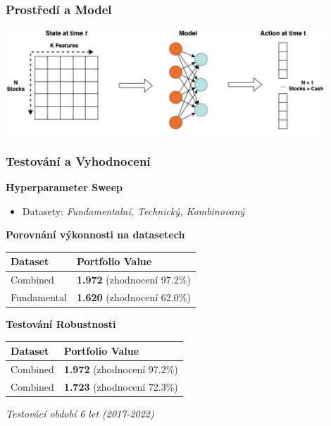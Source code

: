 \begin{frame}
    \frametitle{Prostředí a Model}

    \begin{center}
        \centering
        \includegraphics[width=0.9\textwidth]{img/env}
    \end{center}
\end{frame}

\begin{frame}
    \frametitle{Testování a Vyhodnocení}
    \textbf{Hyperparameter Sweep}
    \begin{itemize}
        \item Datasety: \textit{Fundamentalní, Technický, Kombinovaný}
    \end{itemize}
    \textbf{Porovnání výkonnosti na datasetech}
    \begin{table}
        \centering
        {\footnotesize
            \begin{tabular}{|ll|}
                \hline
                \textbf{Dataset}                        & \textbf{Portfolio Value}                                       \\ \hline
                \textcolor[RGB]{50,150,50}{Combined}    & \textcolor[RGB]{50,150,50}{\textbf{1.972} (zhodnocení 97.2\%)} \\
                \textcolor[RGB]{150,50,50}{Fundamental} & \textcolor[RGB]{150,50,50}{\textbf{1.620} (zhodnocení 62.0\%)} \\ \hline
            \end{tabular}
        }
        \label{tab:datasets-comparison}
    \end{table}
    \textbf{Testování Robustnosti}
    \begin{table}[H]
        \centering
        {\footnotesize
            \begin{tabular}{|ll|}
                \hline
                \textbf{Dataset}                     & \textbf{Portfolio Value}                                       \\ \hline
                \textcolor[RGB]{50,150,50}{Combined} & \textcolor[RGB]{50,150,50}{\textbf{1.972} (zhodnocení 97.2\%)} \\
                \textcolor[RGB]{150,50,50}{Combined} & \textcolor[RGB]{150,50,50}{\textbf{1.723} (zhodnocení 72.3\%)} \\ \hline
            \end{tabular}
        }
    \end{table}
    \vfill
    \textit{\small Testovácí období 6 let (2017-2022)}
\end{frame}

